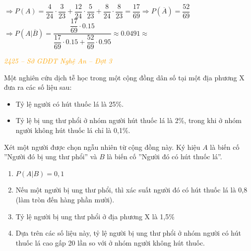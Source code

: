 \documentclass[twoside,final]{hcmut-report}
\newcommand{\exercise}[1]{\begin{exercisebox}#1\end{exercisebox}}
\newcommand{\result}[1]{\fcolorbox{red}{white}{#1}}
\begin{document}
$\Rightarrow P(A) = \dfrac{4}{24}\cdot\dfrac{3}{23} + \dfrac{12}{24}\cdot\dfrac{5}{23} + \dfrac{8}{24}\cdot\dfrac{8}{23} = \dfrac{17}{69} \Rightarrow P(\overline{A}) = \dfrac{52}{69}$\\
$\Rightarrow P(A|\overline{B}) = \dfrac{\dfrac{17}{69}\cdot 0.15}{\dfrac{17}{69}\cdot 0.15 + \dfrac{52}{69}\cdot0.95} \approx 0.0491 \approx$ \result{$0.05$}

\exercise{\textcolor{orange}{\textit{2425 -- Sở GDĐT Nghệ An -- Đợt 3}}

    Một nghiên cứu dịch tễ học trong một cộng đồng dân số tại một địa phương X đưa ra các số liệu sau:
    \begin{itemize}[itemsep=0pt, topsep=0pt, parsep=0pt,label=-]
        \item Tỷ lệ người có hút thuốc lá là 25\%.
        \item Tỷ lệ bị ung thư phổi ở nhóm người hút thuốc lá là 2\%, trong khi ở nhóm người không hút thuốc lá chỉ là 0,1\%.
    \end{itemize}

    Xét một người được chọn ngẫu nhiên từ cộng đồng này. Ký hiệu $A$ là biến cố ''Người đó bị ung thư phổi'' và $B$ là biến cố ''Người đó có hút thuốc lá''.
    \begin{enumerate}[itemsep=0pt, topsep=0pt, parsep=0pt,label=\alph*)]
        \item $P(A|B) = 0,1$
        \item Nếu một người bị ung thư phổi, thì xác suất người đó có hút thuốc lá là 0,8 (làm tròn đến hàng phần mười).
        \item Tỷ lệ người bị ung thư phổi ở địa phương X là 1,5\%
        \item Dựa trên các số liệu này, tỷ lệ người bị ung thư phổi ở nhóm người có hút thuốc lá cao gấp 20 lần so với ở nhóm người không hút thuốc.
    \end{enumerate}}
\end{document}
